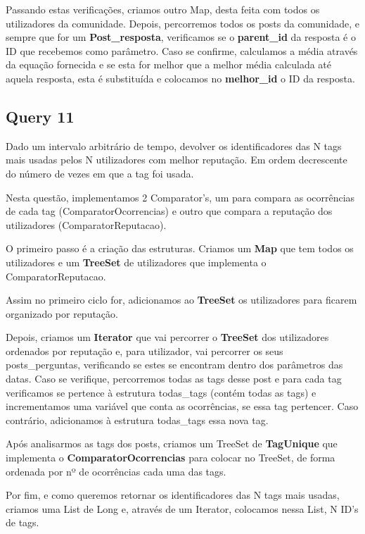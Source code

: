 \documentclass[a4paper]{article}
\begin{document}
Passando estas verificações, criamos outro Map, desta feita com todos os utilizadores
da comunidade. Depois, percorremos todos os posts da comunidade, e sempre que for um 
\textbf{Post\_resposta}, verificamos se o \textbf{parent\_id} da resposta é o ID que
recebemos como parâmetro. Caso se confirme, calculamos a média através da equação
fornecida e se esta for melhor que a melhor média calculada até aquela resposta, 
esta é substituída e colocamos no \textbf{melhor\_id} o ID da resposta.

\subsection{Query 11}

Dado um intervalo arbitrário de tempo, devolver os identificadores das N tags
mais usadas pelos N utilizadores com melhor reputação. Em ordem decrescente 
do número de vezes em que a tag foi usada.

Nesta questão, implementamos 2 Comparator's, um para compara as ocorrências de 
cada tag (ComparatorOcorrencias) e outro que compara a reputação dos utilizadores 
(ComparatorReputacao).

O primeiro passo é a criação das estruturas. Criamos um \textbf{Map} que tem todos
os utilizadores e um \textbf{TreeSet} de utilizadores que implementa o 
ComparatorReputacao.

Assim no primeiro ciclo for, adicionamos ao \textbf{TreeSet} os utilizadores para
ficarem organizado por reputação.

Depois, criamos um \textbf{Iterator} que vai percorrer o \textbf{TreeSet} dos
utilizadores ordenados por reputação e, para utilizador, vai percorrer os seus
posts\_perguntas, verificando se estes se encontram dentro dos parâmetros das datas.
Caso se verifique, percorremos todas as tags desse post e para cada tag verificamos
se pertence à estrutura todas\_tags (contém todas as tags) e incrementamos uma 
variável que conta as ocorrências, se essa tag pertencer. Caso contrário, 
adicionamos à estrutura todas\_tags essa nova tag.

Após analisarmos as tags dos posts, criamos um TreeSet de \textbf{TagUnique} que
implementa o \textbf{ComparatorOcorrencias} para colocar no TreeSet, de forma
ordenada por nº de ocorrências cada uma das tags.

Por fim, e como queremos retornar os identificadores das N tags mais usadas, 
criamos uma List de Long  e, através de um Iterator, colocamos nessa List, 
N ID's de tags.
\end{document}
